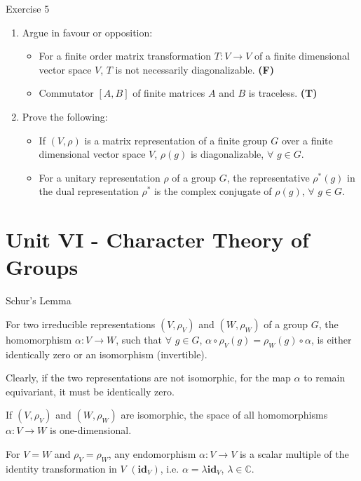 \documentclass{beamer}
\begin{document}
\begin{frame}{Exercise 5}
    \begin{enumerate}
        \item Argue in favour or opposition:
        \begin{itemize}
            \item For a finite order matrix transformation $T:V\xrightarrow{}V$ of a finite dimensional vector space $V$, $T$ is not necessarily diagonalizable. \textbf{(F)}
            \item Commutator $[A,B]$ of finite matrices $A$ and $B$ is traceless. \textbf{(T)}
        \end{itemize}
        \item Prove the following:
        \begin{itemize}
            \item If $(V,\rho)$ is a matrix representation of a finite group $G$ over a finite dimensional vector space $V$, $\rho(g)$ is diagonalizable, $\forall$ $g\in G$.
            \item For a unitary representation $\rho$ of a group $G$, the representative $\rho^*(g)$ in the dual representation $\rho^*$ is the complex conjugate of $\rho(g)$, $\forall$ $g\in G$. 
        \end{itemize}
    \end{enumerate}
\end{frame}

\section{Unit VI - Character Theory of Groups}

\begin{frame}{Schur's Lemma}
    \begin{lemma}
        For two irreducible representations $(V,\rho_V)$ and $(W,\rho_W)$ of a group $G$, the homomorphism $\alpha:V\xrightarrow{}W$, such that $\forall$ $g\in G$, $\alpha\circ\rho_V(g)=\rho_W(g)\circ\alpha$, is either identically zero or an isomorphism (invertible).
    \end{lemma}
    Clearly, if the two representations are not isomorphic, for the map $\alpha$ to remain equivariant, it must be identically zero.
    \begin{corollary}
        If $(V,\rho_V)$ and $(W,\rho_W)$ are isomorphic, the space of all homomorphisms $\alpha:V\xrightarrow{}W$ is one-dimensional.
    \end{corollary}
    \begin{corollary}
        For $V=W$ and $\rho_V=\rho_W$, any endomorphism $\alpha:V\xrightarrow{}V$ is a scalar multiple of the identity transformation in $V$ $(\mathbf{id}_V)$, i.e. $\alpha=\lambda\mathbf{id}_V$, $\lambda\in\mathbb{C}$.
    \end{corollary}
\end{frame}
\end{document}
